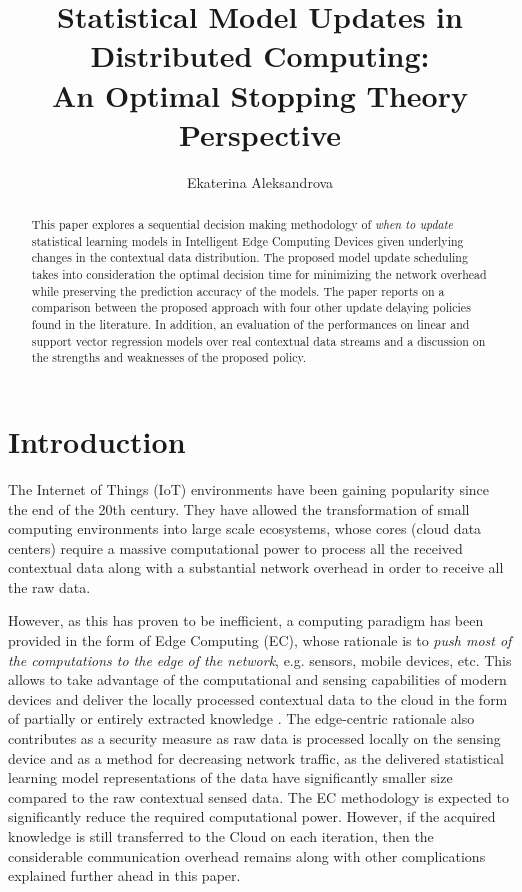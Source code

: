 \documentclass{mpaper}
\begin{document}
\title{Statistical Model Updates in Distributed Computing:\\ An Optimal Stopping Theory Perspective}
\author{Ekaterina Aleksandrova}

\maketitle

\begin{abstract}
This paper explores a sequential decision making methodology of \textit{when to update} statistical learning models in Intelligent Edge Computing Devices given underlying changes in the contextual data distribution. The proposed model update scheduling takes into consideration the optimal decision time for minimizing the network overhead while preserving the prediction accuracy of the models. The paper reports on a comparison between the proposed approach with four other update delaying policies found in the literature. In addition, an evaluation of the performances on linear and support vector regression models over real contextual data streams and a discussion on the strengths and weaknesses of the proposed policy.
\end{abstract}

\section{Introduction}
The Internet of Things (IoT) environments have been gaining popularity since the end of the 20th century. They have allowed the transformation of small computing environments into large scale ecosystems, whose cores (cloud data centers) require a massive computational 
power to process all the received contextual data along with a substantial network overhead in order to receive all the raw data.

However, as this has proven to be inefficient, a computing paradigm has been provided in the form of Edge Computing (EC), whose rationale is to \textit{push most of the computations to the edge of the network}, e.g. sensors, mobile devices, etc. This allows to take advantage of the computational and sensing capabilities of modern devices and deliver the locally processed contextual data to the cloud in the form of partially or entirely extracted knowledge \cite{anagnostop2014}.
The edge-centric rationale also contributes as a security measure as raw data is processed locally on the sensing device and as a method for decreasing network traffic, as the delivered statistical learning model representations of the data have significantly smaller size compared to the raw contextual sensed data. The EC methodology is expected to significantly reduce the required computational power. However, if the acquired knowledge is still transferred to the Cloud on each iteration, then the considerable communication overhead remains along with other complications explained further ahead in this paper. 
\end{document}
